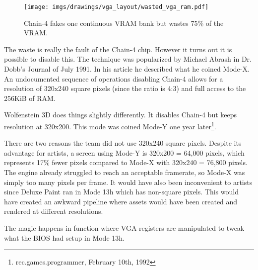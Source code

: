 \documentclass[book.tex]{subfiles}
\begin{document}
\begin{figure}[H]
\centering
 \texttt{[image: imgs/drawings/vga\_layout/wasted\_vga\_ram.pdf]}
  \caption{Chain-4 fakes one continuous VRAM bank but wastes 75\% of the VRAM.}
 \end{figure}

 \par
 The waste is really the fault of the Chain-4 chip. However it turns out it is possible to disable this. The technique was popularized by Michael Abrash in Dr. Dobb's Journal of July 1991. In his article he described what he coined Mode-X. An undocumented sequence of operations disabling Chain-4 allows for a resolution of 320x240 square pixels (since the ratio is 4:3) and full access to the 256KiB of RAM.\\
 \par
 Wolfenstein 3D does things slightly differently. It disables Chain-4 but keeps resolution at 320x200. This mode was coined Mode-Y one year later\footnote{rec.games.programmer, February 10th, 1992}. \\
 \par
 There are two reasons the team did not use 320x240 square pixels. Despite its advantage for artists, a screen using Mode-Y is 320x200 = 64,000 pixels, which represents 17\% fewer pixels compared to Mode-X with 320x240 = 76,800 pixels. The engine already struggled to reach an acceptable framerate, so Mode-X was simply too many pixels per frame. It would have also been inconvenient to artists since Deluxe Paint ran in Mode 13h which has non-square pixels. This would have created an awkward pipeline where assets would have been created and rendered at different resolutions.
 \par
 \par
  \begin{minipage}{\textwidth}

\end{minipage}
 \par

The magic happens in function  where VGA registers are manipulated to tweak what the BIOS had setup in Mode 13h. \\

 \par
 \begin{minipage}{\textwidth}

\end{minipage}
\end{document}
